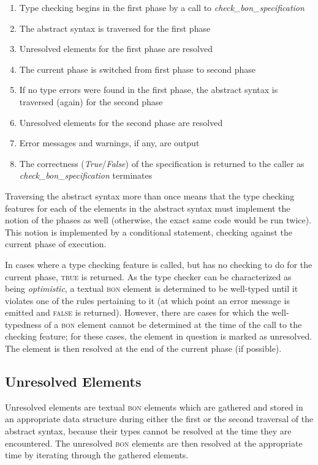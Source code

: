 \begin{enumerate}
\item Type checking begins in the first phase by a call to \textit{check\_bon\_specification}
\item The abstract syntax is traversed for the first phase
\item Unresolved elements for the first phase are resolved
\item The current phase is switched from first phase to second phase
\item If no type errors were found in the first phase, the abstract syntax is traversed (again) for the second phase
\item Unresolved elements for the second phase are resolved
\item Error messages and warnings, if any, are output
\item The correctness (\textit{True}/\textit{False}) of the specification is returned to the caller as \textit{check\_bon\_specification} terminates
\end{enumerate}

Traversing the abstract syntax more than once means that the type checking features for each of the elements in the abstract syntax must implement the notion of the phases as well (otherwise, the exact same code would be run twice). This notion is implemented by a conditional statement, checking against the current phase of execution.

In cases where a type checking feature is called, but has no checking to do for the current phase, \textsc{true} is returned. As the type checker can be characterized as being \textit{optimistic}, a textual \textsc{bon} element is determined to be well-typed until it violates one of the rules pertaining to it (at which point an error message is emitted and \textsc{false} is returned). However, there are cases for which the well-typedness of a \textsc{bon} element cannot be determined at the time of the call to the checking feature; for these cases, the element in question is marked as unresolved. The element is then resolved at the end of the current phase (if possible).
\subsection{Unresolved Elements}
\label{implementation-unresolved-elements}
\label{implementation-unresolved-elements}
Unresolved elements are textual \textsc{bon} elements which are gathered and stored in an appropriate data structure during either the first or the second traversal of the abstract syntax, because their types cannot be resolved at the time they are encountered. The unresolved \textsc{bon} elements are then resolved at the appropriate time by iterating through the gathered elements.
